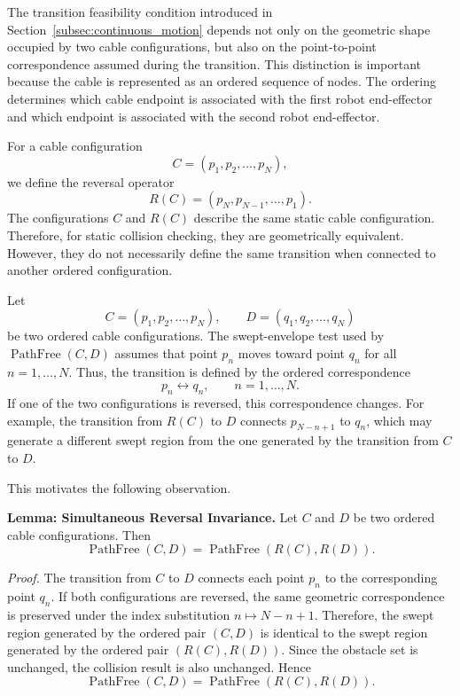 \documentclass{pas}
\begin{document}
The transition feasibility condition introduced in
Section~\ref{subsec:continuous_motion} depends not only
on the geometric shape occupied by two cable configurations, but also on the
point-to-point correspondence assumed during the transition. This distinction is
important because the cable is represented as an ordered sequence of nodes. The
ordering determines which cable endpoint is associated with the first robot
end-effector and which endpoint is associated with the second robot end-effector.

For a cable configuration
\begin{equation}
C=(p_1,p_2,\ldots,p_N),
\end{equation}
we define the reversal operator
\begin{equation}
R(C)=(p_N,p_{N-1},\ldots,p_1).
\end{equation}
The configurations $C$ and $R(C)$ describe the same static cable configuration.
Therefore, for static collision checking, they are geometrically equivalent.
However, they do not necessarily define the same transition when connected to
another ordered configuration.

Let
\begin{equation}
C=(p_1,p_2,\ldots,p_N),
\qquad
D=(q_1,q_2,\ldots,q_N)
\end{equation}
be two ordered cable configurations. The swept-envelope test used by
$\operatorname{PathFree}(C,D)$ assumes that point $p_n$ moves toward point
$q_n$ for all $n=1,\ldots,N$. Thus, the transition is defined by the ordered
correspondence
\begin{equation}
p_n \longleftrightarrow q_n,
\qquad n=1,\ldots,N.
\end{equation}
If one of the two configurations is reversed, this correspondence changes. For
example, the transition from $R(C)$ to $D$ connects $p_{N-n+1}$ to $q_n$,
which may generate a different swept region from the one generated by the
transition from $C$ to $D$.

This motivates the following observation.

\textbf{Lemma: Simultaneous Reversal Invariance.}
Let $C$ and $D$ be two ordered cable configurations. Then
\begin{equation}
\operatorname{PathFree}(C,D)
=
\operatorname{PathFree}(R(C),R(D)).
\end{equation}

\textit{Proof.}
The transition from $C$ to $D$ connects each point $p_n$ to the corresponding
point $q_n$. If both configurations are reversed, the same geometric
correspondence is preserved under the index substitution
$n \mapsto N-n+1$. Therefore, the swept region generated by the ordered pair
$(C,D)$ is identical to the swept region generated by the ordered pair
$(R(C),R(D))$. Since the obstacle set is unchanged, the collision result is also
unchanged. Hence
\begin{equation}
\operatorname{PathFree}(C,D)
=
\operatorname{PathFree}(R(C),R(D)).
\end{equation}
\end{document}
